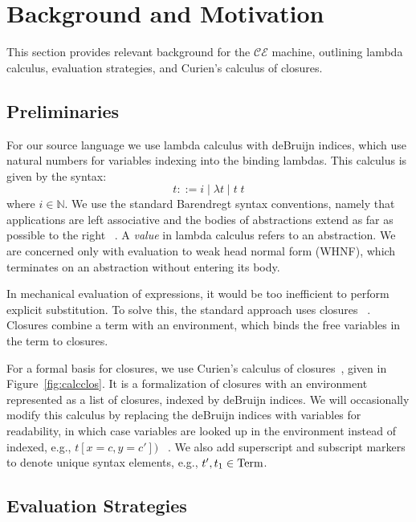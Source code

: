 \section{Background and Motivation} \label{sec:back}

This section provides relevant background for the $\mathcal{CE}$ machine,
outlining lambda calculus, evaluation strategies, and Curien's calculus of
closures.

\subsection{Preliminaries}

For our source language we use lambda calculus with deBruijn indices, which
use natural numbers for variables indexing into the binding lambdas.  This
calculus is given by the syntax: $$ t::= i \; | \; \lambda t \; | \; t \; t $$
where $i \in \mathbb{N}$. We use the standard Barendregt syntax conventions,
namely that applications are left associative and the bodies of abstractions
extend as far as possible to the right ~\cite{barendregt1984lambda}. A
\emph{value} in lambda calculus refers to an abstraction. We are concerned only
with evaluation to weak head normal form (WHNF), which terminates on an
abstraction without entering its body.

In mechanical evaluation of expressions, it would be too inefficient to perform
explicit substitution. To solve this, the standard approach uses closures
~\cite{landin1964mechanical,curien1991abstract,jonesstg,biernacka2007concrete}.
Closures combine a term with an environment, which binds the free variables in
the term to closures. 

For a formal basis for closures, we use Curien's calculus of
closures~\cite{curien1991abstract}, given in Figure~\ref{fig:calcclos}.  It is a
formalization of closures with an environment represented as a list of closures,
indexed by deBruijn indices. We will occasionally modify this calculus by
replacing the deBruijn indices with variables for readability, in which case
variables are looked up in the environment instead of indexed, e.g., $t[x = c, y
= c'])$ ~\cite{barendregt1984lambda}. We also add superscript and subscript
markers to denote unique syntax elements, e.g., $t', t_1 \in \textnormal{Term}$. 

\subsection{Evaluation Strategies} \label{sec:eval}

